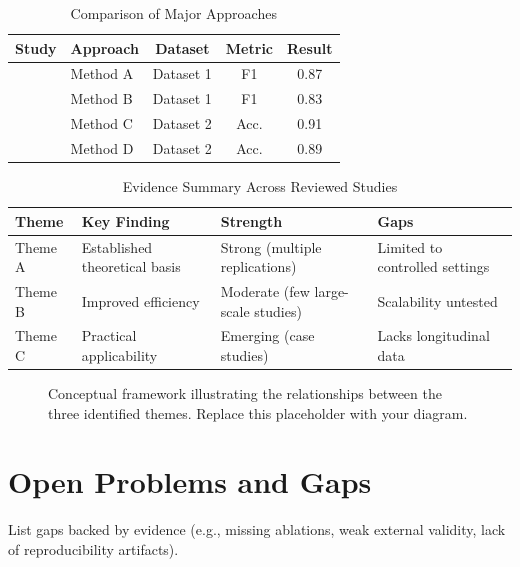 \documentclass[11pt]{article}
\begin{document}
\begin{table}[ht]
  \centering
  \caption{Comparison of Major Approaches}
  \label{tab:comparison}
  \begin{tabular}{llccc}
    \toprule
    Study & Approach & Dataset & Metric & Result \\
    \midrule
    \citet{smith2023}   & Method A & Dataset 1 & F1    & 0.87 \\
    \citet{jones2022}   & Method B & Dataset 1 & F1    & 0.83 \\
    \citet{other2021}   & Method C & Dataset 2 & Acc.  & 0.91 \\
    \citet{diff2022}    & Method D & Dataset 2 & Acc.  & 0.89 \\
    \bottomrule
  \end{tabular}
\end{table}

\begin{table}[ht]
  \centering
  \caption{Evidence Summary Across Reviewed Studies}
  \label{tab:evidence}
  \begin{tabular}{lp{3cm}p{3cm}p{3cm}}
    \toprule
    Theme & Key Finding & Strength & Gaps \\
    \midrule
    Theme A & Established theoretical basis & Strong (multiple replications) & Limited to controlled settings \\
    Theme B & Improved efficiency & Moderate (few large-scale studies) & Scalability untested \\
    Theme C & Practical applicability & Emerging (case studies) & Lacks longitudinal data \\
    \bottomrule
  \end{tabular}
\end{table}

\begin{figure}[ht]
  \centering
  \caption{Conceptual framework illustrating the relationships between the
  three identified themes. Replace this placeholder with your diagram.}
  \label{fig:framework}
\end{figure}

\section{Open Problems and Gaps}
List gaps backed by evidence (e.g., missing ablations, weak external validity, lack of reproducibility artifacts).
\end{document}

